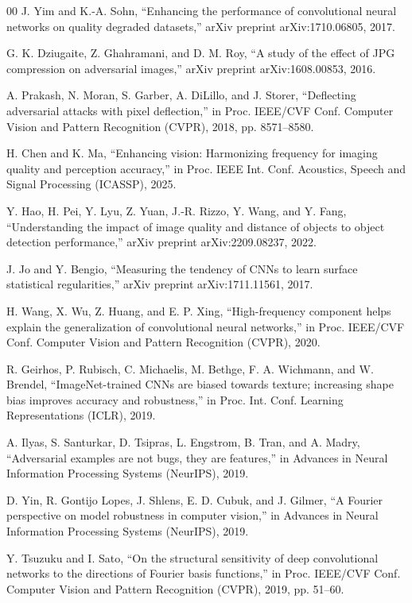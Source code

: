\documentclass[conference]{IEEEtran}
\begin{document}
\begin{thebibliography}{00}
 J. Yim and K.-A. Sohn, ``Enhancing the performance of
convolutional neural networks on quality degraded datasets,'' arXiv preprint
arXiv:1710.06805, 2017.

 G. K. Dziugaite, Z. Ghahramani, and D. M. Roy, ``A study of the
effect of JPG compression on adversarial images,'' arXiv preprint
arXiv:1608.00853, 2016.

 A. Prakash, N. Moran, S. Garber, A. DiLillo, and J. Storer,
``Deflecting adversarial attacks with pixel deflection,'' in Proc. IEEE/CVF
Conf. Computer Vision and Pattern Recognition (CVPR), 2018, pp. 8571--8580.

 H. Chen and K. Ma, ``Enhancing vision: Harmonizing frequency for
imaging quality and perception accuracy,'' in Proc. IEEE Int. Conf. Acoustics,
Speech and Signal Processing (ICASSP), 2025.

 Y. Hao, H. Pei, Y. Lyu, Z. Yuan, J.-R. Rizzo, Y. Wang, and Y.
Fang, ``Understanding the impact of image quality and distance of objects to
object detection performance,'' arXiv preprint arXiv:2209.08237, 2022.

 J. Jo and Y. Bengio, ``Measuring the tendency of CNNs to learn
surface statistical regularities,'' arXiv preprint arXiv:1711.11561, 2017.

 H. Wang, X. Wu, Z. Huang, and E. P. Xing, ``High-frequency
component helps explain the generalization of convolutional neural networks,''
in Proc. IEEE/CVF Conf. Computer Vision and Pattern Recognition (CVPR), 2020.

 R. Geirhos, P. Rubisch, C. Michaelis, M. Bethge, F. A. Wichmann,
and W. Brendel, ``ImageNet-trained CNNs are biased towards texture; increasing
shape bias improves accuracy and robustness,'' in Proc. Int. Conf. Learning
Representations (ICLR), 2019.

 A. Ilyas, S. Santurkar, D. Tsipras, L. Engstrom, B. Tran, and A.
Madry, ``Adversarial examples are not bugs, they are features,'' in Advances in
Neural Information Processing Systems (NeurIPS), 2019.

 D. Yin, R. Gontijo Lopes, J. Shlens, E. D. Cubuk, and J. Gilmer,
``A Fourier perspective on model robustness in computer vision,'' in Advances
in Neural Information Processing Systems (NeurIPS), 2019.

 Y. Tsuzuku and I. Sato, ``On the structural sensitivity of deep
convolutional networks to the directions of Fourier basis functions,'' in Proc.
IEEE/CVF Conf. Computer Vision and Pattern Recognition (CVPR), 2019, pp.
51--60.


\end{thebibliography}
\end{document}
